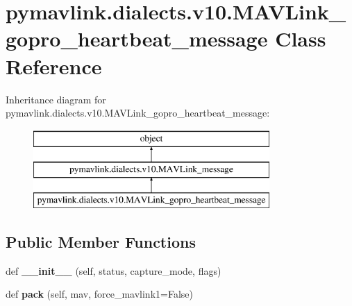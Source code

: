 \hypertarget{classpymavlink_1_1dialects_1_1v10_1_1MAVLink__gopro__heartbeat__message}{}\section{pymavlink.\+dialects.\+v10.\+M\+A\+V\+Link\+\_\+gopro\+\_\+heartbeat\+\_\+message Class Reference}
\label{classpymavlink_1_1dialects_1_1v10_1_1MAVLink__gopro__heartbeat__message}
Inheritance diagram for pymavlink.\+dialects.\+v10.\+M\+A\+V\+Link\+\_\+gopro\+\_\+heartbeat\+\_\+message\+:\begin{figure}[H]
\begin{center}
\leavevmode
\includegraphics[height=3.000000cm]{classpymavlink_1_1dialects_1_1v10_1_1MAVLink__gopro__heartbeat__message}
\end{center}
\end{figure}
\subsection*{Public Member Functions}
\begin{DoxyCompactItemize}
\item 
\mbox{\label{classpymavlink_1_1dialects_1_1v10_1_1MAVLink__gopro__heartbeat__message_a114d015b1574c268414078ae5e5ff6e0}} 
def {\bfseries \+\_\+\+\_\+init\+\_\+\+\_\+} (self, status, capture\+\_\+mode, flags)
\item 
\mbox{\label{classpymavlink_1_1dialects_1_1v10_1_1MAVLink__gopro__heartbeat__message_a1846073fa2991c2f446af7cfe4af03b7}} 
def {\bfseries pack} (self, mav, force\+\_\+mavlink1=False)
\end{DoxyCompactItemize}

